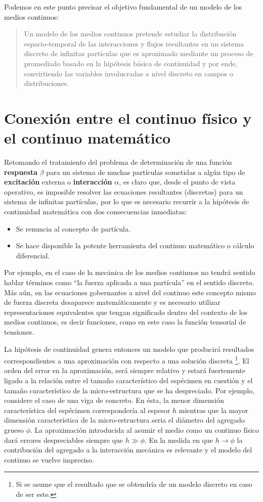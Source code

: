 \documentclass[../notas medios.tex]{subfiles}
\begin{document}
Podemos en este punto precisar el objetivo fundamental de un modelo de los medios continuos:
\begin{quote}
Un modelo de los medios continuos pretende estudiar la distribución espacio-temporal de las interacciones  y flujos   resultantes en un sistema discreto de infinitas partículas que es aproximado mediante un proceso de promediado basado en la hipótesis básica de continuidad y por ende, convirtiendo las variables involucradas a nivel discreto en campos o distribuciones.
\end{quote}

\section{Conexión entre el continuo físico y el continuo matemático}
Retomando el tratamiento del problema de determinación de una función {\bf
respuesta} $\beta$ para un sistema de muchas partículas sometidas a algún tipo de {\bf excitación} externa o {\bf interacción} $\alpha$, es
claro que, desde el punto de vista operativo, es imposible resolver las ecuaciones
resultantes (discretas) para un sistema de infinitas partículas, por lo que es necesario recurrir a la hipótesis de continuidad matemática con dos consecuencias inmediatas:
\begin{itemize}
\item Se renuncia al concepto de partícula.
\item Se hace disponible la potente herramienta del continuo matemático o
cálculo diferencial.
\end{itemize}

Por ejemplo, en el caso de la mecánica de los medios continuos no tendrá sentido
hablar términos como ``la fuerza aplicada a una partícula” en el sentido discreto. 
Más aún, en las ecuaciones gobernantes a nivel del continuo este concepto mismo de fuerza discreta desaparece matemáticamente y es necesario utilizar representaciones equivalentes que tengan significado dentro del contexto de los medios continuos, es decir funciones, como en este caso la función tensorial de tensiones.

La hipótesis de continuidad genera entonces un modelo que producirá resultados correspondientes a una aproximación con respecto a una solución discreta \footnote{Si se asume que el resultado que se obtendría de un modelo discreto en caso de ser este.}. El orden del error en la aproximación, será siempre relativo y estará fuertemente ligado a la relación entre el tamaño característico del espécimen en cuestión y el tamaño característico de la micro-estructura que se ha despreciado.  Por ejemplo, considere el caso de una viga de concreto.  En ésta, la menor dimensión característica del espécimen correspondería al espesor $h$ mientras que la mayor dimensión característica de la micro-estructura seria el diámetro del agregado grueso $\phi$.  La aproximación introducida al asumir el medio como un continuo físico dará errores despreciables siempre que $h \gg \phi$.  En la medida en que $h \to \phi$   la contribución del agregado a la interacción mecánica es relevante y el modelo del continuo se vuelve impreciso.
\end{document}
